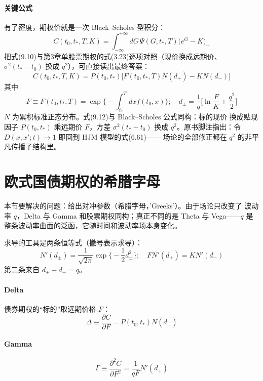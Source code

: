 \paragraph{关键公式}
有了密度，期权价就是一次 Black--Scholes 型积分：
\begin{equation*}
C(t_0,t_*,T,K)=\int_{-\infty}^{+\infty}dG\,\Psi(G,t_*,T)
\bigl(e^{G}-K\bigr)_{+}\tag{9.11}
\end{equation*}
把式(9.10)与第3章单股票期权的式(3.23)逐项对照（现价换成远期价、
$\sigma^{2}(t_*-t_0)$ 换成 $q^{2}$），可直接读出最终答案：
\begin{equation*}
C(t_0,t_*,T,K)=P(t_0,t_*)\bigl[F(t_0,t_*,T)N(d_{+})-KN(d_{-})\bigr]\tag{9.12}
\end{equation*}
其中
\begin{equation*}
F\equiv F(t_0,t_*,T)=\exp\biggl\{-\int_{t_*}^{T}dxf(t_0,x)\biggr\};\quad
d_{\pm}=\frac{1}{q}\biggl[\ln\frac{F}{K}\pm\frac{q^{2}}{2}\biggr]
\end{equation*}
$N$ 为累积标准正态分布。式(9.12)与 Black--Scholes 公式同构：标的现价
换成贴现因子 $P(t_0,t_*)$ 乘远期价 $F$，方差 $\sigma^{2}(t_*-t_0)$ 换成
$q^{2}$。原书脚注指出：令 $D(x,x';t)\to1$ 即回到 HJM 模型的式(6.61)——
场论的全部修正都在 $q^{2}$ 的非平凡传播子结构里。

\section{欧式国债期权的希腊字母}

本节要解决的问题：给出对冲参数（希腊字母，'Greeks'）。由于场论只改变了
波动率 $q$，Delta 与 Gamma 和股票期权同构；真正不同的是 Theta 与
Vega——$q$ 是整条波动率曲面的泛函，它随时间和波动率场本身变化。

求导的工具是两条恒等式（撇号表示求导）：
\begin{equation*}
N'(d_{\pm})=\frac{1}{\sqrt{2\pi}}\exp\biggl\{-\frac{1}{2}d_{\pm}^{2}
\biggr\};\quad FN'(d_{+})=KN'(d_{-})\tag{9.13}
\end{equation*}
第二条来自 $d_{+}-d_{-}=q$。

\paragraph{Delta}
债券期权的“标的”取远期价格 $F$：
\begin{equation*}
\Delta\equiv\frac{\partial C}{\partial F}=P(t_0,t_*)N(d_{+})
\end{equation*}

\paragraph{Gamma}
\begin{equation*}
\Gamma\equiv\frac{\partial^{2}C}{\partial F^{2}}
=\frac{1}{qF}N'(d_{+})
\end{equation*}

